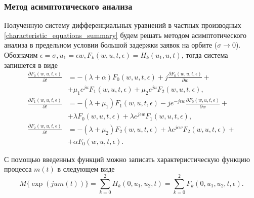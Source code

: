 \subsubsection{Метод асимптотического анализа}
Полученную систему дифференциальных уравнений в частных производных \eqref{characteristic_equations_summary} будем решать методом асимптотического анализа \cite{nazarov2017asymptotic} в предельном условии большой задержки заявок на орбите ($\sigma \rightarrow 0$).
Обозначим $\epsilon = \sigma,   u_{1}= \epsilon w,   F_{k}(w,u,t,\epsilon) = H_{k}(u_{1},u,t)$, тогда система запишется в виде
\begin{equation} \label{asymptotic_equations_summary}
	\begin{split}
		\frac{{\partial F_{0}(w,u,t,\epsilon)}}{{\partial t}} &= -(\lambda + \alpha)F_{0}(w,u,t,\epsilon) + j
		\frac{{\partial F_{0}(w,u,t,\epsilon)}}{{\partial w}} +\\  &+ \mu_{1} e^{ju}F_{1}(w,u,t,\epsilon) + \mu_{2}e^{ju}F_{2}(w,u,t,\epsilon) ,
		\\
		\frac{{\partial F_{1}(w,u,t,\epsilon)}}{{\partial t}} &= -(\lambda + \mu_{1})F_{1}(w,u,t,\epsilon) - j e^{-j\epsilon w}
		\frac{{\partial F_{0}(w,u,t,\epsilon)}}{{\partial w}} +\\  &+ \lambda F_{0}(w,u,t,\epsilon) + \lambda e^{j\epsilon w}F_{1}(w,u,t,\epsilon) ,
		\\
		\frac{{\partial F_{2}(w,u,t,\epsilon)}}{{\partial t}} &= -(\lambda + \mu_{2})F_{2}(w,u,t,\epsilon)  + \lambda e^{j\epsilon w}F_{2}(w,u,t,\epsilon) +\\  &+ \alpha F_{0}(w,u,t,\epsilon).
	\end{split}
\end{equation}  

С помощью введенных функций можно записать характеристическую функцию процесса $m(t)$ в следующем виде
\begin{equation*}
	M\{\exp(jum(t))\}=\sum_{k=0}^{2}H_{k}(0,u_{1},u_{2},t) = \sum_{k=0}^{2}F_{k}(0,u_{1},u_{2},t,\epsilon).
\end{equation*}


